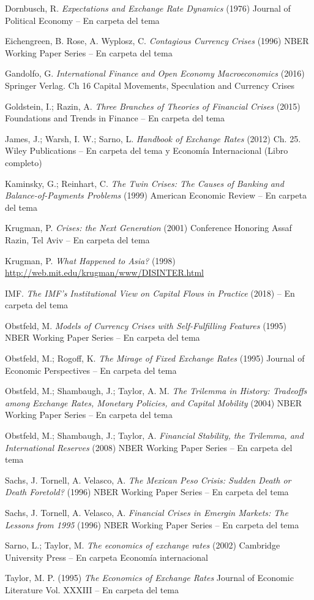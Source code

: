 \documentclass{nuevotema}
\begin{document}
Dornbusch, R. \textit{Expectations and Exchange Rate Dynamics} (1976) Journal of Political Economy -- En carpeta del tema

Eichengreen, B. Rose, A. Wyplosz, C. \textit{Contagious Currency Crises} (1996) NBER Working Paper Series -- En carpeta del tema

Gandolfo, G. \textit{International Finance and Open Economy Macroeconomics} (2016) Springer Verlag. Ch 16 Capital Movements, Speculation and Currency Crises

Goldstein, I.; Razin, A. \textit{Three Branches of Theories of Financial Crises} (2015) Foundations and Trends in Finance -- En carpeta del tema

James, J.; Warsh, I. W.; Sarno, L. \textit{Handbook of Exchange Rates} (2012) Ch. 25. Wiley Publications -- En carpeta del tema y Economía Internacional (Libro completo)

Kaminsky, G.; Reinhart, C. \textit{The Twin Crises: The Causes of Banking and Balance-of-Payments Problems} (1999) American Economic Review -- En carpeta del tema

Krugman, P. \textit{Crises: the Next Generation} (2001) Conference Honoring Assaf Razin, Tel Aviv -- En carpeta del tema

Krugman, P. \textit{What Happened to Asia?} (1998) \url{http://web.mit.edu/krugman/www/DISINTER.html}

IMF. \textit{The IMF's Institutional View on Capital Flows in Practice} (2018) -- En carpeta del tema

Obstfeld, M. \textit{Models of Currency Crises with Self-Fulfilling Features} (1995) NBER Working Paper Series -- En carpeta del tema

Obstfeld, M.; Rogoff, K. \textit{The Mirage of Fixed Exchange Rates} (1995) Journal of Economic Perspectives -- En carpeta del tema

Obstfeld, M.; Shambaugh, J.; Taylor, A. M. \textit{The Trilemma in History: Tradeoffs among Exchange Rates, Monetary Policies, and Capital Mobility} (2004) NBER Working Paper Series -- En carpeta del tema

Obstfeld, M.; Shambaugh, J.; Taylor, A. \textit{Financial Stability, the Trilemma, and International Reserves} (2008) NBER Working Paper Series -- En carpeta del tema

Sachs, J. Tornell, A. Velasco, A. \textit{The Mexican Peso Crisis: Sudden Death or Death Foretold?} (1996) NBER Working Paper Series -- En carpeta del tema

Sachs, J. Tornell, A. Velasco, A. \textit{Financial Crises in Emergin Markets: The Lessons from 1995} (1996) NBER Working Paper Series -- En carpeta del tema

Sarno, L.; Taylor, M. \textit{The economics of exchange rates} (2002) Cambridge University Press -- En carpeta Economía internacional

Taylor, M. P. (1995) \textit{The Economics of Exchange Rates} Journal of Economic Literature Vol. XXXIII -- En carpeta del tema
\end{document}
